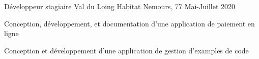 

\begin{cventries}

  \cventry
    {Développeur stagiaire} %
    {Val du Loing Habitat} %
    {Nemours, 77} %
    {Mai-Juillet 2020} %
    {
      \begin{cvitems} %
        \item {Conception, développement, et documentation d'une application de paiement en ligne}
        \item {Conception et développement d'une application de gestion d'examples de code}
      \end{cvitems}
    }

\end{cventries}
